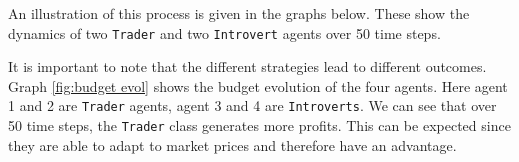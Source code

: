 \documentclass[a4paper,12pt]{article} %
\begin{document}
An illustration of this process is given in the graphs below. These show the dynamics of two \texttt{Trader} and two \texttt{Introvert} agents over 50 time steps.

It is important to note that the different strategies lead to different outcomes. Graph \ref{fig:budget evol} shows the budget evolution of the four agents. Here agent 1 and 2 are \texttt{Trader} agents, agent 3 and 4 are \texttt{Introverts}. We can see that over 50 time steps, the \texttt{Trader} class generates more profits. This can be expected since they are able to adapt to market prices and therefore have an advantage.

\newpage
\end{document}
